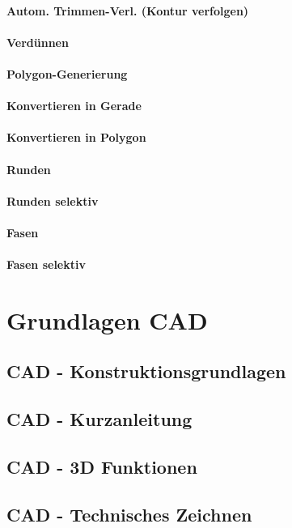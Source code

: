 \documentclass[a4paper]{book}
\begin{document}
			\subsubsection{Autom. Trimmen-Verl. (Kontur verfolgen)} 
			\subsubsection{Verdünnen} 
			\subsubsection{Polygon-Generierung} 
			\subsubsection{Konvertieren in Gerade} 
			\subsubsection{Konvertieren in Polygon}
			\subsubsection{Runden} 
			\subsubsection{Runden selektiv} 
			\subsubsection{Fasen} 
			\subsubsection{Fasen selektiv} 
						
\chapter{Grundlagen CAD}
	\section{CAD - Konstruktionsgrundlagen}
	\section{CAD - Kurzanleitung}
	\section{CAD - 3D Funktionen}
	\section{CAD - Technisches Zeichnen}
\end{document}
